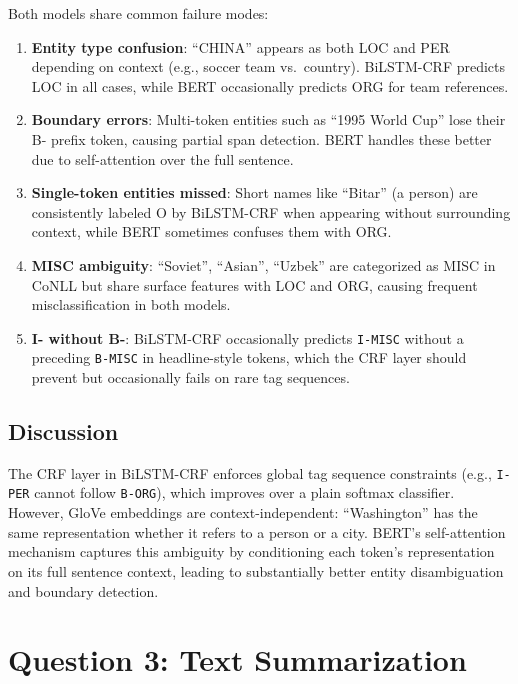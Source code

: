\documentclass[12pt,a4paper]{article}
\begin{document}
Both models share common failure modes:

\begin{enumerate}
    \item \textbf{Entity type confusion}: ``CHINA'' appears as both LOC and PER depending on context (e.g., soccer team vs.\ country). BiLSTM-CRF predicts LOC in all cases, while BERT occasionally predicts ORG for team references.
    \item \textbf{Boundary errors}: Multi-token entities such as ``1995 World Cup'' lose their B- prefix token, causing partial span detection. BERT handles these better due to self-attention over the full sentence.
    \item \textbf{Single-token entities missed}: Short names like ``Bitar'' (a person) are consistently labeled O by BiLSTM-CRF when appearing without surrounding context, while BERT sometimes confuses them with ORG.
    \item \textbf{MISC ambiguity}: ``Soviet'', ``Asian'', ``Uzbek'' are categorized as MISC in CoNLL but share surface features with LOC and ORG, causing frequent misclassification in both models.
    \item \textbf{I- without B-}: BiLSTM-CRF occasionally predicts \texttt{I-MISC} without a preceding \texttt{B-MISC} in headline-style tokens, which the CRF layer should prevent but occasionally fails on rare tag sequences.
\end{enumerate}

\subsection{Discussion}

The CRF layer in BiLSTM-CRF enforces global tag sequence constraints (e.g., \texttt{I-PER} cannot follow \texttt{B-ORG}), which improves over a plain softmax classifier. However, GloVe embeddings are context-independent: ``Washington'' has the same representation whether it refers to a person or a city. BERT's self-attention mechanism captures this ambiguity by conditioning each token's representation on its full sentence context, leading to substantially better entity disambiguation and boundary detection.

\section{Question 3: Text Summarization}
\end{document}
